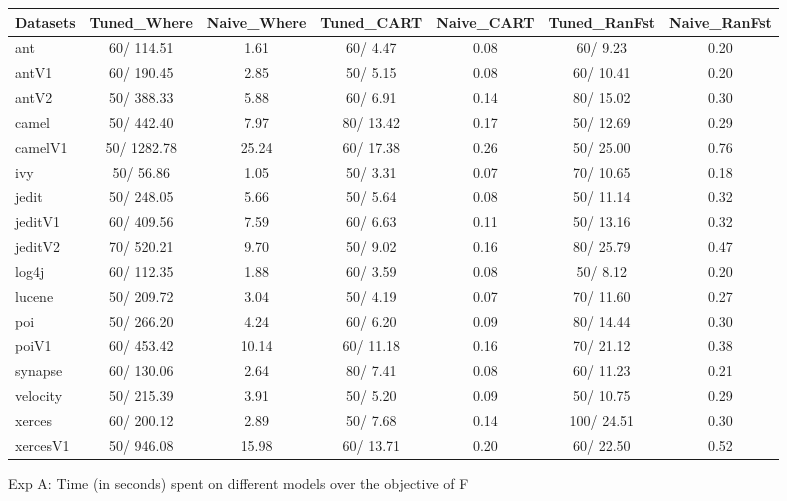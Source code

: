 \documentclass{acm_proc_article-sp}
\begin{document}
\begin{figure*}[!ht]
\scriptsize
\centering
  \begin{tabular}{l|c |c |c |c |c |c }
    \hline\hline
    Datasets & Tuned\_Where & Naive\_Where & Tuned\_CART & Naive\_CART & Tuned\_RanFst & Naive\_RanFst\\
    \hline
    ant & 60/ 114.51 & 1.61 & 60/ 4.47 & 0.08 & 60/ 9.23 & 0.20\\
    antV1 & 60/ 190.45 & 2.85 & 50/ 5.15 & 0.08 & 60/ 10.41 & 0.20\\
    antV2 & 50/ 388.33 & 5.88 & 60/ 6.91 & 0.14 & 80/ 15.02 & 0.30\\
    camel & 50/ 442.40 & 7.97 & 80/ 13.42 & 0.17 & 50/ 12.69 & 0.29\\
    camelV1 & 50/ 1282.78 & 25.24 & 60/ 17.38 & 0.26 & 50/ 25.00 & 0.76\\
    ivy & 50/ 56.86 & 1.05 & 50/ 3.31 & 0.07 & 70/ 10.65 & 0.18\\
    jedit & 50/ 248.05 & 5.66 & 50/ 5.64 & 0.08 & 50/ 11.14 & 0.32\\
    jeditV1 & 60/ 409.56 & 7.59 & 60/ 6.63 & 0.11 & 50/ 13.16 & 0.32\\
    jeditV2 & 70/ 520.21 & 9.70 & 50/ 9.02 & 0.16 & 80/ 25.79 & 0.47\\
    log4j & 60/ 112.35 & 1.88 & 60/ 3.59 & 0.08 & 50/ 8.12 & 0.20\\
    lucene & 50/ 209.72 & 3.04 & 50/ 4.19 & 0.07 & 70/ 11.60 & 0.27\\
    poi & 50/ 266.20 & 4.24 & 60/ 6.20 & 0.09 & 80/ 14.44 & 0.30\\
    poiV1 & 60/ 453.42 & 10.14 & 60/ 11.18 & 0.16 & 70/ 21.12 & 0.38\\
    synapse & 60/ 130.06 & 2.64 & 80/ 7.41 & 0.08 & 60/ 11.23 & 0.21\\
    velocity & 50/ 215.39 & 3.91 & 50/ 5.20 & 0.09 & 50/ 10.75 & 0.29\\
    xerces & 60/ 200.12 & 2.89 & 50/ 7.68 & 0.14 & 100/ 24.51 & 0.30\\
    xercesV1 & 50/ 946.08 & 15.98 & 60/ 13.71 & 0.20 & 60/ 22.50 & 0.52\\
  \end{tabular}
  \caption{ Exp A: Time (in seconds) spent on different models over the objective of F}
\end{figure*}
\end{document}
